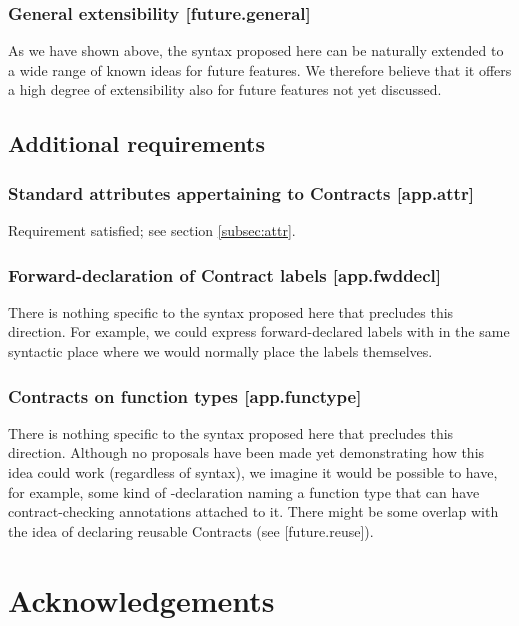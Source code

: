 \subsubsection{General extensibility  [future.general]}

As we have shown above, the syntax proposed here can be naturally extended to a wide range of known ideas for future features. We therefore believe that it offers a high degree of extensibility also for future features not yet discussed.

\label{subsec:future}

\subsection{Additional requirements}

\subsubsection{Standard attributes appertaining to Contracts  [app.attr]}

Requirement satisfied; see section \ref{subsec:attr}.

\subsubsection{ Forward-declaration of Contract labels  [app.fwddecl]}

There is nothing specific to the syntax proposed here that precludes this direction. For example, we could express forward-declared labels with  in the same syntactic place where we would normally place the labels themselves.

\subsubsection{Contracts on function types  [app.functype]}

There is nothing specific to the syntax proposed here that precludes this direction. Although no proposals have been made yet demonstrating how this idea could work (regardless of syntax), we imagine it would be possible to have, for example, some kind of -declaration naming a function type that can have contract-checking annotations attached to it. There might be some overlap with the idea of declaring reusable Contracts (see [future.reuse]).

\section*{Acknowledgements}


